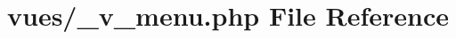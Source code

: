 \hypertarget{__v__menu_8php}{}\section{vues/\+\_\+v\+\_\+menu.php File Reference}
\label{__v__menu_8php}
